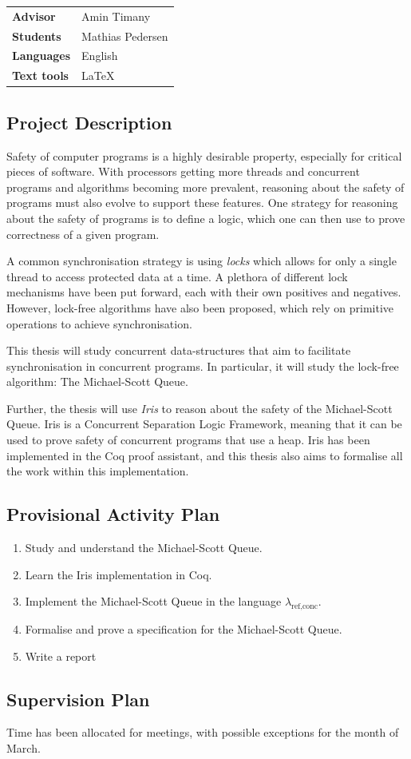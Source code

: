 \documentclass{article}
\begin{document}
\pagestyle{fancy}

\bgroup{}
\begin{table}[h]
\begin{tabular}{ll}
\textbf{Advisor}     & Amin Timany \\
\textbf{Students}    & Mathias Pedersen \\
\textbf{Languages}   & English \\
\textbf{Text tools}  & \LaTeX \\
\end{tabular}
\end{table}
\egroup\vspace{-0.cm}

\subsection*{Project Description}
Safety of computer programs is a highly desirable property, especially for critical pieces of software. With processors getting more threads and concurrent programs and algorithms becoming more prevalent, reasoning about the safety of programs must also evolve to support these features. One strategy for reasoning about the safety of programs is to define a logic, which one can then use to prove correctness of a given program.

A common synchronisation strategy is using \textit{locks} which allows for only a single thread to access protected data at a time. A plethora of different lock mechanisms have been put forward, each with their own positives and negatives. However, lock-free algorithms have also been proposed, which rely on primitive operations to achieve synchronisation.

This thesis will study concurrent data-structures that aim to facilitate synchronisation in concurrent programs. In particular, it will study the lock-free algorithm: The Michael-Scott Queue.

Further, the thesis will use \textit{Iris} to reason about the safety of the Michael-Scott Queue. Iris is a Concurrent Separation Logic Framework, meaning that it can be used to prove safety of concurrent programs that use a heap. Iris has been implemented in the Coq proof assistant, and this thesis also aims to formalise all the work within this implementation.


\subsection*{Provisional Activity Plan}
\begin{enumerate}
    \item Study and understand the Michael-Scott Queue.
    \item Learn the Iris implementation in Coq.
    \item Implement the Michael-Scott Queue in the language $\lambda_{{\textrm{ref,conc}}}$.
    \item Formalise and prove a specification for the Michael-Scott Queue.
    \item Write a report
\end{enumerate}

\subsection*{Supervision Plan}
Time has been allocated for meetings, with possible exceptions for the month of March.
\end{document}
